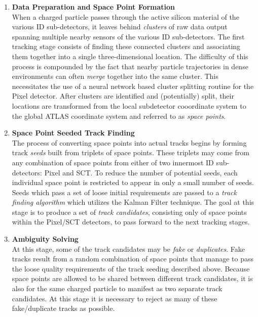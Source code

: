 \begin{enumerate}
    \item \textbf{Data Preparation and Space Point Formation}\\
        When a charged particle passes through the active silicon material of the various ID sub-detectors, it leaves behind \textit{clusters} of 
        raw data output spanning multiple nearby sensors of the various ID sub-detectors.
        The first tracking stage consists of finding these connected clusters and associating them together into a single three-dimensional location.
        The difficulty of this process is compounded by the fact that nearby particle trajectories in dense environments can often \textit{merge} together into the same cluster.
        This necessitates the use of a neural network based cluster splitting routine for the Pixel detector.
        After clusters are identified and (potentially) split, their locations are transformed from the local subdetector cooordinate system to the global ATLAS coordinate system and referred to as \textit{space points}.
    \item \textbf{Space Point Seeded Track Finding}\\
        The process of converting space points into actual tracks begins by forming track \textit{seeds} built from triplets of space points.
        These triplets may come from any combination of space points from either of two innermost ID sub-detectors: Pixel and SCT.
        To reduce the number of potential seeds, each individual space point is restricted to appear in only a small number of seeds.
        Seeds which pass a set of loose initial requirements are passed to a \textit{track finding algorithm} which utilizes the Kalman Filter technique.
        The goal at this stage is to produce a set of \textit{track candidates}, consisting only of space points within the Pixel/SCT detectors, to pass forward to the next tracking stages.
    \item \textbf{Ambiguity Solving}\\
        At this stage, some of the track candidates may be \textit{fake} or \textit{duplicates}.
        Fake tracks result from a random combination of space points that manage to pass the loose quality requirements of the track seeding described above.
        Because space points are allowed to be shared between different track candidates, it is also for the same charged particle to manifest as two separate track candidates.
        At this stage it is necessary to reject as many of these fake/duplicate tracks as possible.

\end{enumerate}
